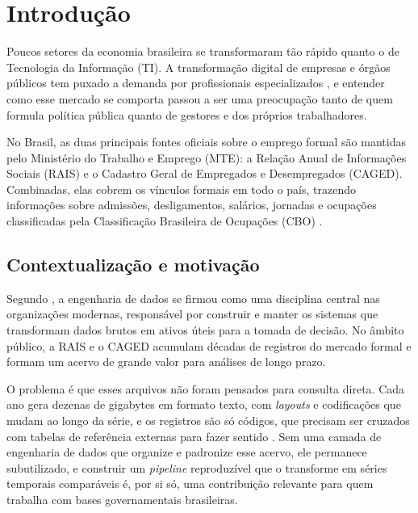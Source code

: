 
\chapter{Introdução}
\label{cap:introducao}

Poucos setores da economia brasileira se transformaram tão rápido quanto o de Tecnologia da Informação (TI). A transformação digital de empresas e órgãos públicos tem puxado a demanda por profissionais especializados \cite{Brasscom2024, Fecomercio2024}, e entender como esse mercado se comporta passou a ser uma preocupação tanto de quem formula política pública quanto de gestores e dos próprios trabalhadores.

No Brasil, as duas principais fontes oficiais sobre o emprego formal são mantidas pelo Ministério do Trabalho e Emprego (MTE): a Relação Anual de Informações Sociais (RAIS) e o Cadastro Geral de Empregados e Desempregados (CAGED). Combinadas, elas cobrem os vínculos formais em todo o país, trazendo informações sobre admissões, desligamentos, salários, jornadas e ocupações classificadas pela Classificação Brasileira de Ocupações (CBO) \cite{RAIS2024, CAGED2024}.

\section{Contextualização e motivação}

Segundo , a engenharia de dados se firmou como uma disciplina central nas organizações modernas, responsável por construir e manter os sistemas que transformam dados brutos em ativos úteis para a tomada de decisão. No âmbito público, a RAIS e o CAGED acumulam décadas de registros do mercado formal e formam um acervo de grande valor para análises de longo prazo.

O problema é que esses arquivos não foram pensados para consulta direta. Cada ano gera dezenas de gigabytes em formato texto, com \textit{layouts} e codificações que mudam ao longo da série, e os registros são só códigos, que precisam ser cruzados com tabelas de referência externas para fazer sentido \cite{RAIS2024, CAGED2024}. Sem uma camada de engenharia de dados que organize e padronize esse acervo, ele permanece subutilizado, e construir um \textit{pipeline} reproduzível que o transforme em séries temporais comparáveis é, por si só, uma contribuição relevante para quem trabalha com bases governamentais brasileiras.

